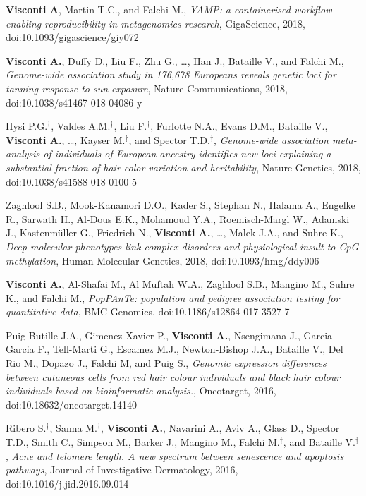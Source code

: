 \documentclass[a4paper,10pt]{article}
\begin{document}
{\begin{itemize}
		 \textbf{Visconti A}, Martin T.C., and Falchi M., \emph{YAMP: a containerised workflow enabling reproducibility in metagenomics research}, GigaScience, 2018, doi:10.1093/gigascience/giy072
		
		 \textbf{Visconti A.}, Duffy D., Liu F., Zhu G., \dots, Han J., Bataille V., and Falchi M., \emph{Genome-wide association study in 176,678 Europeans reveals genetic loci for tanning response to sun exposure}, Nature Communications, 2018, doi:10.1038/s41467-018-04086-y
		
		 Hysi P.G.$^{\textbf{$\dag $}}$, Valdes A.M.$^{\textbf{$\dag $}}$, Liu F.$^{\textbf{$\dag $}}$, Furlotte N.A., Evans D.M., Bataille V., \textbf{Visconti A.}, \dots, Kayser M.$^{\textbf{$\ddag $}}$, and Spector T.D.$^{\textbf{$\ddag $}}$, \emph{Genome-wide association meta-analysis of individuals of European ancestry identifies new loci explaining a substantial fraction of hair color variation and heritability}, Nature Genetics, 2018, doi:10.1038/s41588-018-0100-5
		
		 Zaghlool S.B., Mook-Kanamori D.O., Kader S., Stephan N., Halama A., Engelke R., Sarwath H., Al-Dous E.K., Mohamoud Y.A., Roemisch-Margl W., Adamski J., Kastenmüller G., Friedrich N., \textbf{Visconti A.}, \dots, Malek J.A., and Suhre K., \emph{Deep molecular phenotypes link complex disorders and physiological insult to CpG methylation}, Human Molecular Genetics, 2018, doi:10.1093/hmg/ddy006
				
		 \textbf{Visconti A.}, Al-Shafai M.,  Al Muftah W.A.,  Zaghlool S.B., Mangino M., Suhre K., and Falchi M., \emph{PopPAnTe: population and pedigree association testing for quantitative data}, BMC Genomics, doi:10.1186/s12864-017-3527-7
				
		 Puig-Butille J.A., Gimenez-Xavier P., \textbf{Visconti A.}, Nsengimana J., Garcia-Garcia F., Tell-Marti G., Escamez M.J., Newton-Bishop J.A., Bataille V., Del Rio M., Dopazo J., Falchi M, and Puig S., \emph{Genomic expression differences between cutaneous cells from red hair colour individuals and black hair colour individuals based on bioinformatic analysis.}, Oncotarget, 2016, doi:10.18632/oncotarget.14140
		
		 Ribero S.$^{\textbf{$\dag $}}$, Sanna M.$^{\textbf{$\dag $}}$, \textbf{Visconti A.}, Navarini A., Aviv A., Glass D., Spector T.D., Smith C., Simpson M., Barker J., Mangino M., Falchi M.$^{\textbf{$\ddag $}}$, and Bataille V.$^{\textbf{$\ddag $}}$, \emph{Acne and telomere length. A new spectrum between senescence and apoptosis pathways}, Journal of Investigative Dermatology, 2016, doi:10.1016/j.jid.2016.09.014


\end{itemize}}
\end{document}
